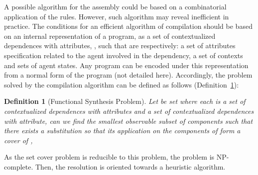 \documentclass{eptcs}
\newtheorem{definition}{Definition}
\newcommand{\ie}[0]{\abbrev{\textit{i.e.}}}
\newcounter{ti}
\begin{document}
A possible algorithm for the assembly could be based on a combinatorial application of the rules. However, such algorithm may reveal inefficient in practice. The conditions for an efficient algorithm of compilation should be based on an internal representation of a program, as a set of contextualized dependences with attributes, , such that  are respectively: a set of attributes specification related to the agent involved in the dependency, a set of contexts and sets of agent states. Any program can be encoded under this representation from a normal form of the program (not detailed here). Accordingly, the problem solved by the compilation algorithm can be defined as follows (Definition~\ref{def:probasm}):
\begin{definition}[Functional Synthesis Problem]
\label{def:probasm}
Let  be set where each  is a set of contextualized dependences with attributes and  a set of contextualized dependences with attribute, can we find the smallest observable subset of components  such that there exists a substitution  so that its application on the components of  form a cover of ,\ie

\end{definition}
As the set cover problem is reducible to this problem, the problem is NP-complete. Then, the resolution is oriented towards a heuristic algorithm. 
\end{document}
